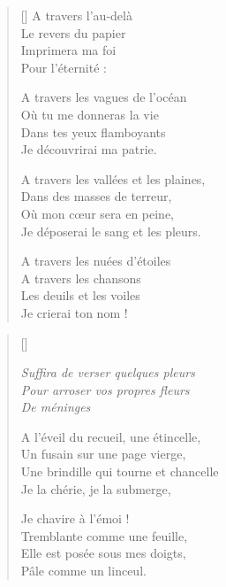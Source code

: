 \newpage

\settowidth{\versewidth}{A travers les vallées et les plaines,}
\begin{verse}[\versewidth]
A travers l'au-delà \\
Le revers du papier \\
Imprimera ma foi \\
Pour l'éternité :

A travers les vagues de l'océan \\
Où tu me donneras la vie \\
Dans tes yeux flamboyants \\
Je découvrirai ma patrie.

A travers les vallées et les plaines, \\
Dans des masses de terreur, \\
Où mon cœur sera en peine, \\
Je déposerai le sang et les pleurs.

A travers les nuées d'étoiles \\
A travers les chansons \\
Les deuils et les voiles \\
Je crierai ton nom !
\end{verse}

\newpage

\settowidth{\versewidth}{Une brindille qui tourne et chancelle}
\begin{verse}[\versewidth]

\emph{\hspace{9em}Suffira de verser quelques pleurs \\
\hspace{9em}Pour arroser vos propres fleurs \\
\hspace{9em}De méninges \\}

A l'éveil du recueil, une étincelle, \\
Un fusain sur une page vierge, \\
Une brindille qui tourne et chancelle \\
Je la chérie, je la submerge,

Je chavire à l'émoi ! \\
Tremblante comme une feuille, \\
Elle est posée sous mes doigts, \\
Pâle comme un linceul.
\end{verse}


